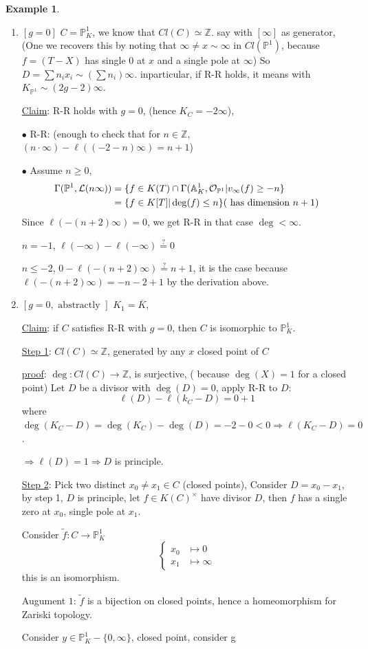 \documentclass[11pt]{article}
\theoremstyle{definition}
\newtheorem{ex}[thm]{Example}
\newcommand{\affn}{\mathbb A}
\newcommand{\proj}{\mathbb P}
\newcommand{\intg}{\mathbb Z}
\newcommand{\call}{{\cal L}}
\newcommand{\calo}{{\cal O}}
\newcommand{\Lrta}{\Longrightarrow}
\newcommand{\lrta}{\longrightarrow}
\begin{document}
 \begin{ex}
 \begin{enumerate}[label=(\arabic*)]
\item $[g=0]$ $C=\proj^1_K$, we know that $Cl(C)\simeq  \intg$. say with $[\infty]$ as generator, (One we recovers this by noting that $\infty \neq x\sim \infty$ in $Cl(\proj^1)$, because $f=(T-X)$ has single $0$ at $x$ and a single pole at $\infty$)
So $D=\sum n_i x_i\sim (\sum n_i)\infty$.  inparticular, if R-R holds, it means with $K_{\proj^1}\sim (2g-2)\infty$.

\underline{Claim}: R-R holds with $g=0$, (hence $K_C=-2\infty$),

$\bullet$ R-R: (enough to check that for $n\in \intg$, $(n\cdot \infty)-\ell((-2-n)\infty)=n+1$)

$\bullet$ Assume $n\geq 0$,
$$
\begin{aligned}
\Gamma(\proj^1,\call(n\infty))&=\{f\in K(T)\cap \Gamma(\affn^1_K,\calo_{\proj^1}|v_{\infty}(f)\geq -n\}\\
&=\{f\in K[T]|\deg(f)\leq n\} (\text{ has dimension $n+1$})
\end{aligned}
$$
Since $\ell(-(n+2)\infty)=0$, we get R-R in that case $\deg< \infty$.

$n=-1$, $\ell(-\infty)-\ell(-\infty)\overset{?}{=}0$

$n\leq -2$, $0-\ell(-(n+2)\infty)\overset{?}{=}n+1$, it is the case because $\ell(-(n+2)\infty)=-n-2+1$ by the derivation above.
\item $[g=0,\text{ abstractly }]$ $K_1=\overline{K}$, 

\underline{Claim}: if $C$ satisfies R-R with $g=0$, then $C$ is isomorphic to $\proj^1_K$.

\underline{Step 1}: $Cl(C)\simeq \intg$, generated by any $x$ closed point of $C$

\underline{proof}: $\deg: Cl(C)\lrta \intg$, is surjective, ( because $\deg(X)=1$ for a closed point) Let $D$ be a divisor with $\deg(D)=0$, apply R-R
 to $D$:
 $$
\ell(D)-\ell(k_C-D)=0+1
 $$
 where $\deg(K_C-D)=\deg(K_C)-\deg(D)=-2-0< 0\Lrta \ell(K_C-D)=0$.

 $\Lrta \ell(D)=1\Lrta D$ is principle.

 \underline{Step 2}: Pick two distinct $x_0\neq x_1\in C$ (closed points), Consider $D=x_0-x_1$, by step 1, $D$ is principle, let $f\in K(C)^\times$ have divisor $D$, then $f$ has a single zero at $x_0$, single pole at $x_1$.

Consider $\tilde{f}: C\lrta \proj^1_K$
$$
\left\{
\begin{aligned}
x_0&\longmapsto 0\\
x_1&\longmapsto \infty
\end{aligned}
\right.
$$
this is an isomorphism.

Augument $1$: $\tilde{f}$ is a bijection on closed points, hence a  homeomorphism for Zariski topology.

Consider $y\in \proj^1_K-\{0,\infty\}$, closed point, consider g

 \end{enumerate}
 \end{ex}
\end{document}
